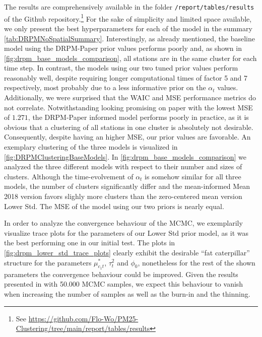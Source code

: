 \documentclass[12pt,a4paper]{article}
\begin{document}
The results are comprehensively available in the folder \texttt{/report/tables/results} of the Github
repository.\footnote{See \url{https://github.com/Flo-Wo/PM25-Clustering/tree/main/report/tables/results}}
For the sake of simplicity and limited space available, we only present the best hyperparameters for each of the model
in the summary \cref{tab:DRPMNoSpatialSummary}. Interestingly, as already mentioned, the baseline model using the 
DRPM-Paper prior values performs poorly and, as shown in \cref{fig:drpm_base_models_comparison}, all stations are in
the same cluster for each time step. In contrast, the models using our two tuned prior values perform reasonably well,
despite requiring longer computational times of factor 5 and 7 respectively, most probably due to a less informative
prior on the $\alpha_t$ values. Additionally, we were surprised that the WAIC and MSE performance metrics do not correlate.
Notwithstanding looking promising on paper with the lowest MSE of $1.271$, the DRPM-Paper informed model performs poorly in practice,
as it is obvious that a clustering of all stations in one cluster is absolutely not desirable. Consequently, despite having
an higher MSE, our prior values are favorable. An exemplary clustering of the three models is visualized in 
\cref{fig:DRPMClusteringBaseModels}. In \cref{fig:drpm_base_models_comparison} we analyzed the three different models
with respect to their number and sizes of clusters. Although the time-evolvement of $\alpha_t$ is somehow similar for all
three models, the number of clusters significantly differ and the mean-informed Mean 2018 version favors slighly more
clusters than the zero-centered mean version Lower Std. The MSE of the model using our two priors is nearly equal.

In order to analyze the convergence behaviour of the MCMC, we exemplarily visualize trace plots for the parameters of
our Lower Std prior model, as it was the best performing one in our initial test. The plots in
\cref{fig:drpm_lower_std_trace_plots} clearly exhibit the desirable \enquote{fat caterpillar} structure for the
parameters $\mu^*_{c_1t}$, $\tau_t^2$ and $\phi_0$, nonetheless for the rest of the shown parameters the convergence
behaviour could be improved. Given the results presented in \cite[Section 4.1]{Page2021-Temporal} with 50.000 MCMC samples,
we expect this behaviour to vanish when increasing the number of samples as well as the burn-in and the thinning.
\end{document}
